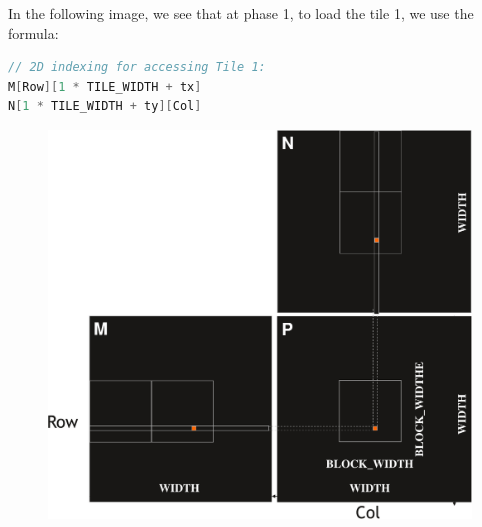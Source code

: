 \begin{itemize}
    In the following image, we see that at phase 1, to load the tile 1, we use the formula:
    \begin{lstlisting}[language=C++]
// 2D indexing for accessing Tile 1:
M[Row][1 * TILE_WIDTH + tx]
N[1 * TILE_WIDTH + ty][Col]\end{lstlisting}
    \begin{figure}[!htp]
        \centering
        \includegraphics[width=.7\textwidth]{img/cuda-implementation-tile-2.pdf}
    \end{figure}
\end{itemize}

\newpage

